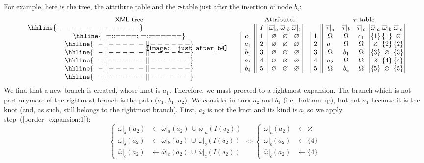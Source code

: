 \noindent
For example, here is the \XML tree, the attribute table and the
\(\tau\)-table just after the insertion of node \(b_4\):
\[
\begin{array}{cc|c||c|@{\;}c@{\;}c@{\;}c@{\;}|c|c||ccc|@{\,}c@{\,}c@{\,}c@{\,}|}
  \text{\XML tree} 
& \multicolumn{2}{c}{} 
& \multicolumn{4}{c}{\text{Attributes}}
& \multicolumn{2}{c}{}
& \multicolumn{6}{c}{\tau\text{-table}}\\
\hhline{-~~----~~------}
\multirow{6}{*}{
\texttt{[image: just\_after\_b4]}
}
& \multicolumn{2}{c||}{} 
& I & \overline{\omega}|_a & \overline{\omega}|_b & \overline{\omega}|_c
& \multicolumn{2}{c||}{} 
& \overline{\tau}|_a & \overline{\tau}|_b & \overline{\tau}|_c 
& \overline{\omega}|_a & \overline{\omega}|_b &
\overline{\omega}|_c\\
\hhline{~~=::====:~=::======}
&& c_1 & 1 & \varnothing & \varnothing & \varnothing & & 
1 & \Omega & \Omega & c_1 & \{1\} & \{1\} & \varnothing\\
\hhline{~~-||----~-||------}
&& a_1 & 2 & \varnothing & \varnothing & \varnothing & & 
2 & a_1 & \Omega & \Omega & \varnothing & \{2\} & \{2\}\\
\hhline{~~-||----~-||------}
&& b_1 & 3 & \varnothing & \varnothing & \varnothing & & 
3 & \Omega & b_1 & \Omega & \{3\} & \varnothing & \{3\}\\
\hhline{~~-||----~-||------}
&& a_2 & 4 & \varnothing & \varnothing & \varnothing & & 
4 & a_2 & \Omega & \Omega & \varnothing & \{4\} & \{4\}\\
\hhline{~~-||----~-||------}
&& b_4 & 5 & \varnothing & \varnothing & \varnothing & & 
5 & \Omega & b_4 & \Omega & \{5\} & \varnothing & \{5\}\\
\hhline{~~-||----~-||------}
\end{array}
\]
We find that a new branch is created, whose knot is
\(a_1\). Therefore, we must proceed to a rightmost expansion. The
branch which is not part anymore of the rightmost branch is the path
(\(a_1\), \(b_1\), \(a_2\)). We consider in turn \(a_2\) and \(b_1\)
(i.e., bottom\hyp{}up), but not \(a_1\) because it is the knot (and,
as such, still belongs to the rightmost branch). First, \(a_2\) is not
the knot and its kind is \(a\), so we apply
step~(\ref{border_expansion:1}):
\[
\left\{
\begin{aligned}
\overline{\omega}|_a(a_2) & \leftarrow \overline{\omega}|_a(a_2) 
\, \cup \, \overline{\omega}|_a(I(a_2))\\
\overline{\omega}|_b(a_2) & \leftarrow \overline{\omega}|_b(a_2) 
\, \cup \, \overline{\omega}|_b(I(a_2))\\
\overline{\omega}|_c(a_2) & \leftarrow \overline{\omega}|_c(a_2) 
\, \cup \, \overline{\omega}|_c(I(a_2))
\end{aligned}
\right.
\Longleftrightarrow
\left\{
\begin{aligned}
\overline{\omega}|_a(a_2) & \leftarrow \varnothing\\
\overline{\omega}|_b(a_2) & \leftarrow \{4\}\\
\overline{\omega}|_c(a_2) & \leftarrow \{4\}
\end{aligned}
\right.
\]
